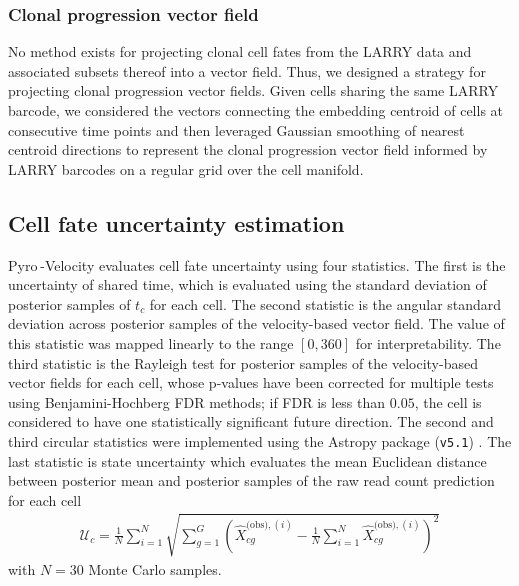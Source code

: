 \documentclass[
  sn-mathphys-num,
  lineno,
  twocolumn]{sn-jnl}
\begin{document}
\subsubsection{Clonal progression vector
field}\label{clonal-progression-vector-field}

No method exists for projecting clonal cell fates from the LARRY data
and associated subsets thereof into a vector field. Thus, we designed a
strategy for projecting clonal progression vector fields. Given cells
sharing the same LARRY barcode, we considered the vectors connecting the
embedding centroid of cells at consecutive time points and then
leveraged Gaussian smoothing of nearest centroid directions to represent
the clonal progression vector field informed by LARRY barcodes on a
regular grid over the cell manifold.

\subsection{Cell fate uncertainty
estimation}\label{sec-methods-fate-uncertainty}

Pyro -Velocity evaluates cell fate uncertainty using four statistics.
The first is the uncertainty of shared time, which is evaluated using
the standard deviation of posterior samples of \(t_c\) for each cell.
The second statistic is the angular standard deviation
\citep{Berens2009-fu} across posterior samples of the velocity-based
vector field. The value of this statistic was mapped linearly to the
range \([0, 360]\) for interpretability. The third statistic is the
Rayleigh test \citep{The-Astropy-Collaboration2022-aw} for posterior
samples of the velocity-based vector fields for each cell, whose
p-values have been corrected for multiple tests using Benjamini-Hochberg
FDR methods; if FDR is less than \(0.05\), the cell is considered to
have one statistically significant future direction. The second and
third circular statistics were implemented using the Astropy package
(\texttt{v5.1}) \citep{The-Astropy-Collaboration2022-aw}. The last
statistic is state uncertainty which evaluates the mean Euclidean
distance between posterior mean and posterior samples of the raw read
count prediction for each cell \begin{align*}
\mathcal{U}_c = \frac{1}{N} \sum_{i=1}^N \sqrt{\sum_{g=1}^G \left(\hat{X}^{\text{(obs)},(i)}_{cg} - \frac{1}{N}\sum_{i=1}^N \hat{X}^{\text{(obs)},(i)}_{cg}\right)^2}
\end{align*} with \(N=30\) Monte Carlo samples.
\end{document}
